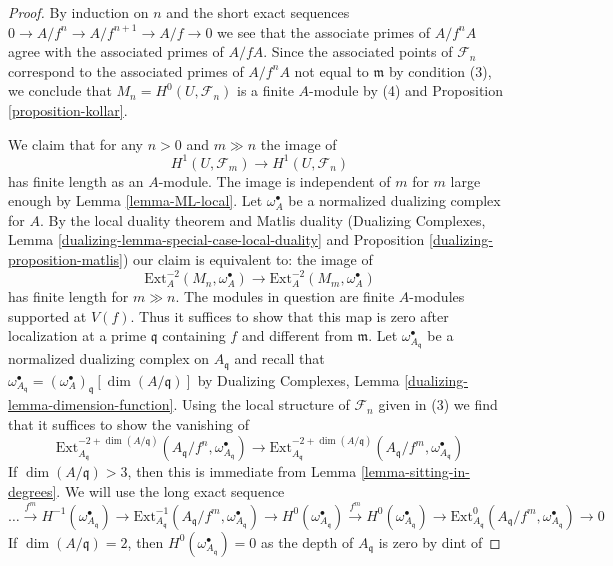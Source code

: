 \begin{proof}
By induction on $n$ and the short exact sequences
$0 \to A/f^n \to A/f^{n + 1} \to A/f \to 0$ we see that
the associate primes of $A/f^nA$ agree with the associated
primes of $A/fA$. Since the associated points of $\mathcal{F}_n$
correspond to the associated primes of $A/f^nA$ not equal to $\mathfrak m$
by condition (3), we conclude that
$M_n = H^0(U, \mathcal{F}_n)$ is a finite $A$-module by
(4) and Proposition \ref{proposition-kollar}.

\medskip\noindent
We claim that for any $n > 0$ and $m \gg n$ the image of
$$
H^1(U, \mathcal{F}_m) \longrightarrow H^1(U, \mathcal{F}_n)
$$
has finite length as an $A$-module. The image is independent
of $m$ for $m$ large enough by Lemma \ref{lemma-ML-local}.
Let $\omega_A^\bullet$ be a normalized dualizing complex for $A$.
By the local duality theorem and Matlis duality
(Dualizing Complexes, Lemma \ref{dualizing-lemma-special-case-local-duality}
and Proposition \ref{dualizing-proposition-matlis})
our claim is equivalent to: the image of
$$
\text{Ext}^{-2}_A(M_n, \omega_A^\bullet) \to
\text{Ext}^{-2}_A(M_m, \omega_A^\bullet)
$$
has finite length for $m \gg n$. The modules in question are
finite $A$-modules supported at $V(f)$. Thus it suffices to show that this
map is zero after localization at a prime $\mathfrak q$
containing $f$ and different from $\mathfrak m$.
Let $\omega_{A_\mathfrak q}^\bullet$ be a normalized
dualizing complex on $A_\mathfrak q$ and recall that
$\omega_{A_\mathfrak q}^\bullet =
(\omega_A^\bullet)_\mathfrak q[\dim(A/\mathfrak q)]$ by
Dualizing Complexes, Lemma \ref{dualizing-lemma-dimension-function}.
Using the local structure of $\mathcal{F}_n$ given in (3)
we find that it suffices to show the vanishing of
$$
\text{Ext}^{-2 + \dim(A/\mathfrak q)}_{A_\mathfrak q}(
A_\mathfrak q/f^n, \omega_{A_\mathfrak q}^\bullet)
\to
\text{Ext}^{-2 + \dim(A/\mathfrak q)}_{A_\mathfrak q}(
A_\mathfrak q/f^m, \omega_{A_\mathfrak q}^\bullet)
$$
If $\dim(A/\mathfrak q) > 3$, then this is immediate from
Lemma \ref{lemma-sitting-in-degrees}. We will use the
long exact sequence
$$
\ldots
\xrightarrow{f^m}
H^{-1}(\omega_{A_\mathfrak q}^\bullet)
\to
\text{Ext}^{-1}_{A_\mathfrak q}(
A_\mathfrak q/f^m, \omega_{A_\mathfrak q}^\bullet) \to
H^0(\omega_{A_\mathfrak q}^\bullet)
\xrightarrow{f^m}
H^0(\omega_{A_\mathfrak q}^\bullet)
\to
\text{Ext}^0_{A_\mathfrak q}(
A_\mathfrak q/f^m, \omega_{A_\mathfrak q}^\bullet) \to 0
$$
If $\dim(A/\mathfrak q) = 2$, then
$H^0(\omega_{A_\mathfrak q}^\bullet) = 0$ as
the depth of $A_\mathfrak q$ is zero by dint of

\end{proof}
